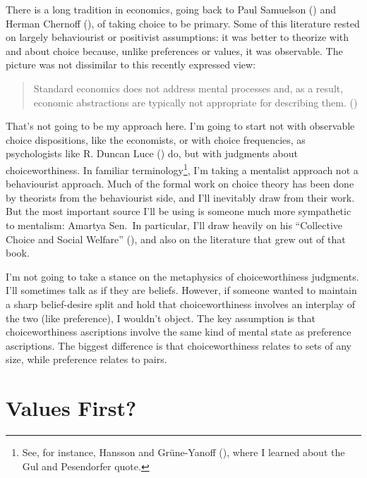 \documentclass[
  11pt,
  letterpaper,
  DIV=11,
  numbers=noendperiod,
  twoside]{scrartcl}
\begin{document}
There is a long tradition in economics, going back to Paul Samuelson
() and Herman Chernoff
(), of taking choice to be primary.
Some of this literature rested on largely behaviourist or positivist
assumptions: it was better to theorize with and about choice because,
unlike preferences or values, it was observable. The picture was not
dissimilar to this recently expressed view:

\begin{quote}
Standard economics does not address mental processes and, as a result,
economic abstractions are typically not appropriate for describing them.
()
\end{quote}

That's not going to be my approach here. I'm going to start not with
observable choice dispositions, like the economists, or with choice
frequencies, as psychologists like R. Duncan Luce
() do, but with judgments about
choiceworthiness. In familiar terminology\footnote{See, for instance,
  Hansson and Grüne-Yanoff (), where
  I learned about the Gul and Pesendorfer quote.}, I'm taking a
mentalist approach not a behaviourist approach. Much of the formal work
on choice theory has been done by theorists from the behaviourist side,
and I'll inevitably draw from their work. But the most important source
I'll be using is someone much more sympathetic to mentalism: Amartya
Sen.~In particular, I'll draw heavily on his ``Collective Choice and
Social Welfare'' (), and
also on the literature that grew out of that book.

I'm not going to take a stance on the metaphysics of choiceworthiness
judgments. I'll sometimes talk as if they are beliefs. However, if
someone wanted to maintain a sharp belief-desire split and hold that
choiceworthiness involves an interplay of the two (like preference), I
wouldn't object. The key assumption is that choiceworthiness ascriptions
involve the same kind of mental state as preference ascriptions. The
biggest difference is that choiceworthiness relates to sets of any size,
while preference relates to pairs.

\section{Values First?}\label{sec-values}
\end{document}
